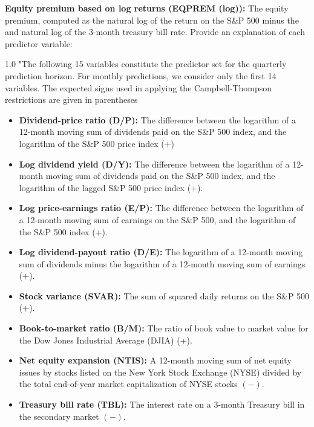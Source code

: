 \documentclass[a4paper,11pt]{article}
\begin{document}
\noindent \textbf{Equity premium based on log returns (EQPREM (log)):} The equity premium, computed as the natural log of the return on the S\&P 500 minus the and natural log of the 3-month treasury bill rate.
\citet{denkloffler2024} Provide an explanation of each predictor variable:
\\
\begin{spacing}{1.0}
\noindent "The following 15 variables constitute the predictor set for the quarterly prediction
horizon. For monthly predictions, we consider only the first 14 variables. The
expected signs used in applying the Campbell-Thompson restrictions are given in
parentheses
\begin{itemize}[noitemsep, topsep=0pt]
\item \textbf{Dividend-price ratio (D/P): } The difference between the logarithm of a
12-month moving sum of dividends paid on the S\&P 500 index, and the
logarithm of the S\&P 500 price index (+) 
\item \textbf{Log dividend yield (D/Y):} The difference between the logarithm of a 12-month moving sum of dividends paid on the S\&P 500 index, and the logarithm of the lagged S\&P 500 price index (+).

\item \textbf{Log price-earnings ratio (E/P):} The difference between the logarithm of a 12-month moving sum of earnings on the S\&P 500, and the logarithm of the S\&P 500 index (+).

\item \textbf{Log dividend-payout ratio (D/E):} The logarithm of a 12-month moving sum of dividends minus the logarithm of a 12-month moving sum of earnings (+).

\item \textbf{Stock variance (SVAR):} The sum of squared daily returns on the S\&P 500 (+).

\item \textbf{Book-to-market ratio (B/M):} The ratio of book value to market value for the Dow Jones Industrial Average (DJIA) (+).

\item \textbf{Net equity expansion (NTIS):} A 12-month moving sum of net equity issues by stocks listed on the New York Stock Exchange (NYSE) divided by the total end-of-year market capitalization of NYSE stocks $(-)$.

\item \textbf{Treasury bill rate (TBL):} The interest rate on a 3-month Treasury bill in the secondary market $(-)$.


\end{itemize}
\end{spacing}
\end{document}
